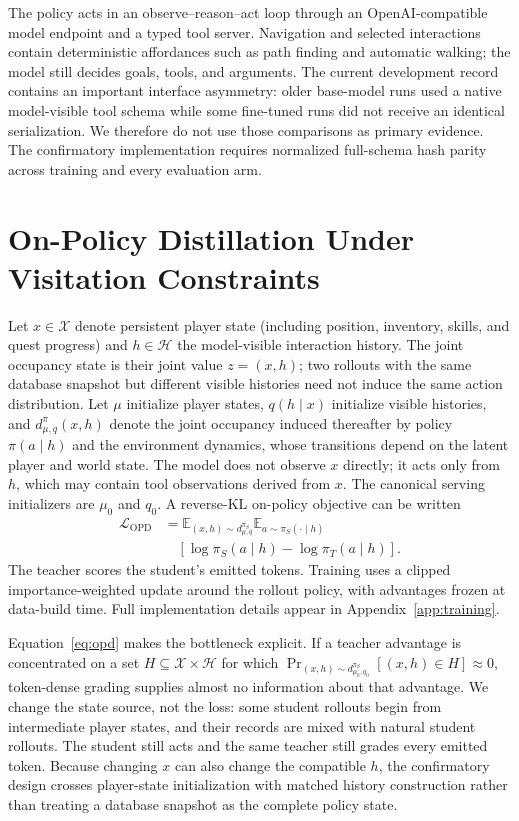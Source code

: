 \documentclass[11pt,a4paper]{article}
\begin{document}
The policy acts in an observe--reason--act loop through an OpenAI-compatible
model endpoint and a typed tool server. Navigation and selected interactions
contain deterministic affordances such as path finding and automatic walking;
the model still decides goals, tools, and arguments. The current development
record contains an important interface asymmetry: older base-model runs used a
native model-visible tool schema while some fine-tuned runs did not receive an
identical serialization. We therefore do not use those comparisons as primary
evidence. The confirmatory implementation requires normalized full-schema hash
parity across training and every evaluation arm.

\section{On-Policy Distillation Under Visitation Constraints}

Let $x\in\mathcal{X}$ denote persistent player state (including position,
inventory, skills, and quest progress) and
$h\in\mathcal{H}$ the model-visible interaction history. The joint occupancy state is
their joint value $z=(x,h)$; two rollouts with the same database snapshot but
different visible histories need not induce the same action distribution. Let
$\mu$ initialize player states, $q(h\mid x)$ initialize visible histories,
and $d^{\pi}_{\mu,q}(x,h)$ denote the joint occupancy induced thereafter by
policy $\pi(a\mid h)$ and the environment dynamics, whose transitions depend on
the latent player and world state. The model does not observe $x$ directly; it
acts only from $h$, which may contain tool observations derived from $x$. The canonical serving initializers
are $\mu_0$ and $q_0$. A reverse-KL on-policy objective can
be written
\begin{equation}
\begin{aligned}
\mathcal{L}_{\mathrm{OPD}}
&=\mathbb{E}_{(x,h)\sim d^{\pi_S}_{\mu,q}}
  \mathbb{E}_{a\sim\pi_S(\cdot\mid h)} \\
&\quad\left[\log\pi_S(a\mid h)-\log\pi_T(a\mid h)\right].
\end{aligned}
\label{eq:opd}
\end{equation}
The teacher scores the student's emitted tokens. Training uses a clipped
importance-weighted update around the rollout policy, with advantages frozen at
data-build time. Full implementation details appear in Appendix~\ref{app:training}.

Equation~\ref{eq:opd} makes the bottleneck explicit. If a teacher advantage is
concentrated on a set $H\subseteq\mathcal{X}\times\mathcal{H}$ for which
$\Pr_{(x,h)\sim d^{\pi_S}_{\mu_0,q_0}}[(x,h)\in H]\approx0$, token-dense grading supplies almost no
information about that advantage. We change the state source, not the loss:
some student rollouts begin from intermediate player states, and
their records are mixed with natural student rollouts. The student still acts
and the same teacher still grades every emitted token. Because changing $x$
can also change the compatible $h$, the confirmatory design crosses
player-state initialization with matched history construction rather than treating a
database snapshot as the complete policy state.
\end{document}
